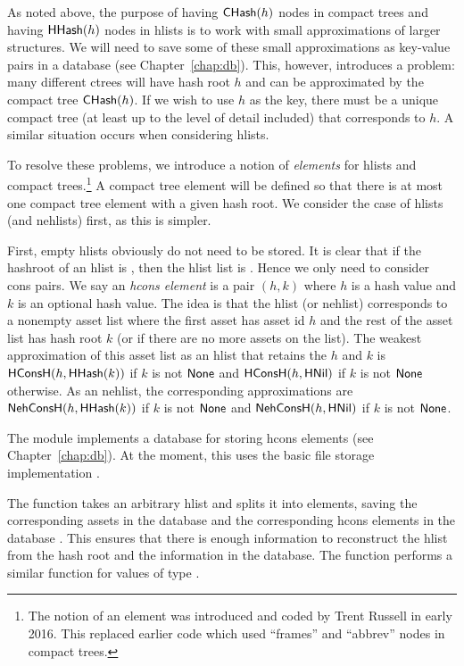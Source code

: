 As noted above, the purpose of having ${\constr{CHash}}(h)$ nodes in compact trees
and having ${\constr{HHash}}(h)$ nodes in hlists
is to work with small approximations of larger structures.
We will need to save some of these small approximations as
key-value pairs in a database (see Chapter~\ref{chap:db}).
This, however, introduces a problem: many different ctrees will have hash root $h$
and can be approximated by the compact tree ${\constr{CHash}}(h)$.
If we wish to use $h$ as the key, there must be a unique compact tree (at least up to the level of detail included)
that corresponds
to $h$. A similar situation occurs when considering hlists.

To resolve these problems, we introduce a notion of {\em{elements}}
for hlists and compact trees.\footnote{The notion of an element was introduced and coded by Trent Russell in early 2016. This replaced earlier code which used ``frames'' and ``abbrev'' nodes in compact trees.}
A compact tree element will be defined so that there is at most one compact tree element with a given hash root.
We consider the case of hlists (and nehlists) first, as this is simpler.

First, empty hlists obviously do not need to be stored. It is clear that if the hashroot of an hlist is {}, then the hlist list is {}.
Hence we only need to consider cons pairs.
We say an {\em{hcons element}} is a pair $(h,k)$ where $h$ is a hash value and $k$
is an optional hash value.
The idea is that the hlist (or nehlist) corresponds to a nonempty asset list where
the first asset has asset id $h$ and the rest of the asset list has hash root $k$ (or {}
if there are no more assets on the list).
The weakest approximation of this asset list as an hlist
that retains the $h$ and $k$ is
${\constr{HConsH}}(h,{\constr{HHash}}(k))$ if $k$ is not ${\val{None}}$
and
${\constr{HConsH}}(h,{\constr{HNil}})$ if $k$ is not ${\val{None}}$
otherwise.
As an nehlist, the corresponding approximations are
${\constr{NehConsH}}(h,{\constr{HHash}}(k))$ if $k$ is not ${\val{None}}$
and
${\constr{NehConsH}}(h,{\constr{HNil}})$ if $k$ is not ${\val{None}}$.

The module {} implements a database for storing hcons elements
(see Chapter~\ref{chap:db}).
At the moment, this uses the basic file storage implementation {}.

The function {} takes an arbitrary hlist
and splits it into elements, saving the corresponding assets in the
{} database
and the corresponding hcons elements in the database {}.
This ensures that there is enough information to reconstruct the
hlist from the hash root and the information in the database.
The function {} performs a similar
function for values of type {}.

